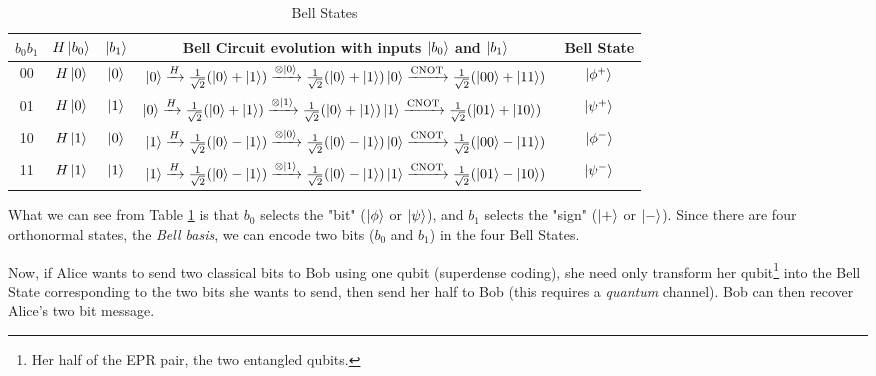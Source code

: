 \documentclass{article}
\theoremstyle{definition}
\begin{document}
\begin{table}[H]
\centering
\begin{tabular}{c | c | c | c | c}
$b_{0} b_{1}$  & $H \ket{b_0}$ & $\ket{b_1}$ & Bell Circuit evolution with inputs $\ket{b_0}$ and $\ket{b_1}$  & Bell State\\
\hline
00  & $H\ket{0}$ & $\ket{0}$ & $\ket{0} \xrightarrow{\scriptsize H}  \frac{1}{\sqrt{2}} (\ket{0} + \ket{1}) 
  \xrightarrow{\otimes \ket{0}}  \frac{1}{\sqrt{2}} (\ket{0} + \ket{1}) \ket{0} \xrightarrow{\scriptsize \text{CNOT}} \frac{1}{\sqrt{2}} (\ket{00} + \ket{11})$ & $\ket{\phi^+}$ \\
01  & $H\ket{0}$ & $\ket{1}$ & $ \ket{0} \xrightarrow{\scriptsize H} \frac{1}{\sqrt{2}} (\ket{0} + \ket{1})  
  \xrightarrow{\scriptsize \otimes \ket{1}} \frac{1}{\sqrt{2}} (\ket{0} + \ket{1})  \ket{1} \xrightarrow{\scriptsize \text{CNOT}}  \frac{1}{\sqrt{2}} (\ket{01} + \ket{10})$\ & $\ket{\psi^+}$ \\
10  & $H\ket{1}$ & $\ket{0}$ & $\ket{1} \xrightarrow{\scriptsize H}  \frac{1}{\sqrt{2}} (\ket{0} - \ket{1})  \xrightarrow{\scriptsize \otimes \ket{0}} \frac{1}{\sqrt{2}} (\ket{0} - \ket{1})  \ket{0} \xrightarrow{\scriptsize \text{CNOT}} \frac{1}{\sqrt{2}}  (\ket{00} - \ket{11})$ & $\ket{\phi^-}$ \\
11    & $H\ket{1}$ & $\ket{1}$ & $\ket{1} \xrightarrow{\scriptsize H}  \frac{1}{\sqrt{2}} (\ket{0} - \ket{1}) 
  \xrightarrow{\scriptsize \otimes  \ket{1}}  \frac{1}{\sqrt{2}} (\ket{0} - \ket{1})  \ket{1} \xrightarrow{\scriptsize \text{CNOT}} \frac{1}{\sqrt{2}}  (\ket{01} - \ket{10})$ & $\ket{\psi^-}$
\end{tabular}
\caption{Bell States}
\label{tab:bell_state}
\end{table}

\bigskip
\noindent
What we can see from Table \ref{tab:bell_state} is that $b_0$
selects the "bit" ($\ket{\phi}$ or $\ket{\psi}$), and $b_1$
selects the "sign" ($\ket{+}$ or $\ket{-}$). Since there are four
orthonormal states, the \emph{Bell basis}, we can encode two bits
($b_0$ and $b_1$) in the four Bell States.

\bigskip
\noindent
Now, if Alice wants to send two classical bits to Bob
using one qubit (superdense coding), she need only 
transform her qubit\footnote{Her half of the EPR pair, 
the two entangled qubits.} into the Bell State 
corresponding to the two bits she wants to send, 
then send her half to Bob (this requires a 
\emph{quantum} channel). Bob can then recover 
Alice's two bit message.
\end{document}
